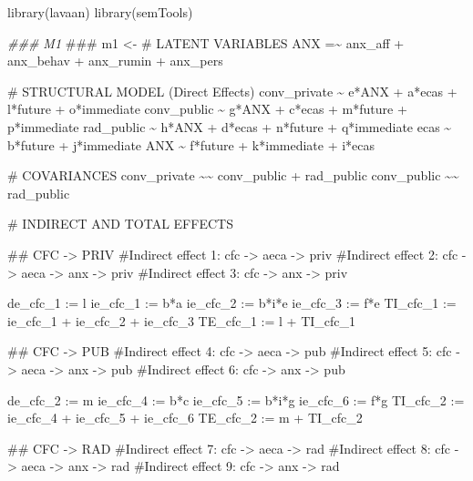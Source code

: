 \documentclass[
  letterpaper,
  DIV=11,
  numbers=noendperiod]{scrreprt}
\newenvironment{Shaded}{\begin{snugshade}}{\end{snugshade}}
\newcommand{\AlertTok}[1]{\textcolor[rgb]{0.68,0.00,0.00}{#1}}
\newcommand{\DocumentationTok}[1]{\textcolor[rgb]{0.37,0.37,0.37}{\textit{#1}}}
\newcommand{\FunctionTok}[1]{\textcolor[rgb]{0.28,0.35,0.67}{#1}}
\newcommand{\NormalTok}[1]{\textcolor[rgb]{0.00,0.23,0.31}{#1}}
\newcommand{\OtherTok}[1]{\textcolor[rgb]{0.00,0.23,0.31}{#1}}
\newcommand{\StringTok}[1]{\textcolor[rgb]{0.13,0.47,0.30}{#1}}
\begin{document}
\begin{Shaded}
\begin{Highlighting}[]
\FunctionTok{library}\NormalTok{(lavaan)}
\FunctionTok{library}\NormalTok{(semTools)}

\DocumentationTok{\#\#\# M1 }\AlertTok{\#\#\#}
\NormalTok{m1 }\OtherTok{\textless{}{-}} \StringTok{\textquotesingle{}}
\StringTok{\# LATENT VARIABLES}
\StringTok{ANX =\textasciitilde{} anx\_aff + anx\_behav + anx\_rumin + anx\_pers}

\StringTok{\# STRUCTURAL MODEL (Direct Effects)}
\StringTok{conv\_private \textasciitilde{} e*ANX + a*ecas + l*future + o*immediate}
\StringTok{conv\_public \textasciitilde{} g*ANX + c*ecas + m*future + p*immediate}
\StringTok{rad\_public \textasciitilde{} h*ANX + d*ecas + n*future + q*immediate}
\StringTok{ecas \textasciitilde{} b*future + j*immediate}
\StringTok{ANX \textasciitilde{} f*future + k*immediate + i*ecas}

\StringTok{\# COVARIANCES}
\StringTok{conv\_private \textasciitilde{}\textasciitilde{} conv\_public + rad\_public}
\StringTok{conv\_public \textasciitilde{}\textasciitilde{} rad\_public}

\StringTok{\# INDIRECT AND TOTAL EFFECTS}

\StringTok{\#\# CFC {-}\textgreater{} PRIV}
\StringTok{\#Indirect effect 1: cfc {-}\textgreater{} aeca {-}\textgreater{} priv}
\StringTok{\#Indirect effect 2: cfc {-}\textgreater{} aeca {-}\textgreater{} anx {-}\textgreater{} priv}
\StringTok{\#Indirect effect 3: cfc {-}\textgreater{} anx {-}\textgreater{} priv}

\StringTok{de\_cfc\_1 := l}
\StringTok{ie\_cfc\_1 := b*a}
\StringTok{ie\_cfc\_2 := b*i*e}
\StringTok{ie\_cfc\_3 := f*e}
\StringTok{TI\_cfc\_1 := ie\_cfc\_1 + ie\_cfc\_2 + ie\_cfc\_3}
\StringTok{TE\_cfc\_1 := l + TI\_cfc\_1}


\StringTok{\#\# CFC {-}\textgreater{} PUB}
\StringTok{\#Indirect effect 4: cfc {-}\textgreater{} aeca {-}\textgreater{} pub}
\StringTok{\#Indirect effect 5: cfc {-}\textgreater{} aeca {-}\textgreater{} anx {-}\textgreater{} pub}
\StringTok{\#Indirect effect 6: cfc {-}\textgreater{} anx {-}\textgreater{} pub}

\StringTok{de\_cfc\_2 := m}
\StringTok{ie\_cfc\_4 := b*c}
\StringTok{ie\_cfc\_5 := b*i*g}
\StringTok{ie\_cfc\_6 := f*g}
\StringTok{TI\_cfc\_2 := ie\_cfc\_4 + ie\_cfc\_5 + ie\_cfc\_6}
\StringTok{TE\_cfc\_2 := m + TI\_cfc\_2}


\StringTok{\#\# CFC {-}\textgreater{} RAD}
\StringTok{\#Indirect effect 7: cfc {-}\textgreater{} aeca {-}\textgreater{} rad}
\StringTok{\#Indirect effect 8: cfc {-}\textgreater{} aeca {-}\textgreater{} anx {-}\textgreater{} rad}
\StringTok{\#Indirect effect 9: cfc {-}\textgreater{} anx {-}\textgreater{} rad}


\end{Highlighting}
\end{Shaded}
\end{document}
